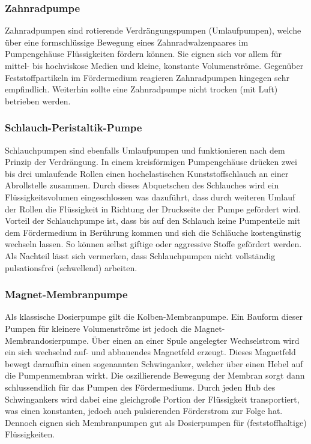 \subsubsection*{Zahnradpumpe}
Zahnradpumpen sind rotierende Verdrängungspumpen (Umlaufpumpen), welche über eine formschlüssige Bewegung eines Zahnradwalzenpaares im Pumpengehäuse Flüssigkeiten fördern können. Sie eignen sich vor allem für mittel- bis hochviskose Medien und kleine, konstante Volumenströme. Gegenüber Feststoffpartikeln im Fördermedium reagieren Zahnradpumpen hingegen sehr empfindlich. Weiterhin sollte eine Zahnradpumpe nicht trocken (mit Luft) betrieben werden. \cite{Ignatowitz.2013} 

\subsubsection*{Schlauch-Peristaltik-Pumpe}
Schlauchpumpen sind ebenfalls Umlaufpumpen und funktionieren nach dem Prinzip der Verdrängung. In einem kreisförmigen Pumpengehäuse drücken zwei bis drei umlaufende Rollen einen hochelastischen Kunststoffschlauch an einer Abrollstelle zusammen. Durch dieses Abquetschen des Schlauches wird ein Flüssigkeitsvolumen eingeschlossen was dazuführt, dass durch weiteren Umlauf der Rollen die Flüssigkeit in Richtung der Druckseite der Pumpe gefördert wird. Vorteil der Schlauchpumpe ist, dass bis auf den Schlauch keine Pumpenteile mit dem Fördermedium in Berührung kommen und sich die Schläuche kostengünstig wechseln lassen. So können selbst giftige oder aggressive Stoffe gefördert werden. Als Nachteil lässt sich vermerken, dass Schlauchpumpen nicht vollständig pulsationsfrei (schwellend) arbeiten. \cite{Ignatowitz.2013}

\subsubsection*{Magnet-Membranpumpe}
Als klassische Dosierpumpe gilt die Kolben-Membranpumpe. Ein Bauform dieser Pumpen für kleinere Volumenströme ist jedoch die Magnet-Membrandosierpumpe. Über einen an einer Spule angelegter Wechselstrom wird ein sich wechselnd auf- und abbauendes Magnetfeld erzeugt. Dieses Magnetfeld bewegt daraufhin einen sogenannten Schwinganker, welcher über einen Hebel auf die Pumpenmembran wirkt. Die oszillierende Bewegung der Membran sorgt dann schlussendlich für das Pumpen des Fördermediums. Durch jeden Hub des Schwingankers wird dabei eine gleichgroße Portion der Flüssigkeit transportiert, was einen  konstanten, jedoch auch pulsierenden Förderstrom zur Folge hat. Dennoch eignen sich Membranpumpen gut als Dosierpumpen für (feststoffhaltige) Flüssigkeiten. \cite{Ignatowitz.2013,Wikipedia.2019}

